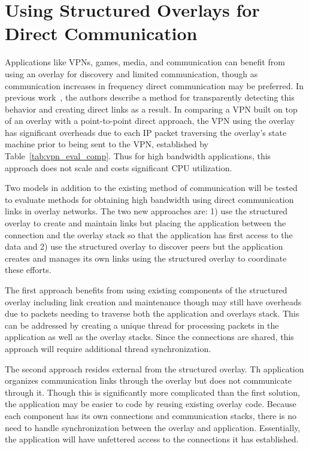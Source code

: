 \section{Using Structured Overlays for Direct Communication}
\label{direct_communication}
Applications like VPNs, games, media, and communication can benefit from using
an overlay for discovery and limited communication, though as communication
increases in frequency direct communication may be preferred.  In previous
work~\cite{wow}, the authors describe a method for transparently detecting this
behavior and creating direct links as a result.  In comparing a VPN built on
top of an overlay with a point-to-point direct approach, the VPN using the
overlay has significant overheads due to each IP packet traversing the overlay's
state machine prior to being sent to the VPN, established by
Table~\ref{tab:vpn_eval_comp}.  Thus for high bandwidth applications, this
approach does not scale and costs significant CPU utilization.

Two models in addition to the existing method of communication will be tested
to evaluate methods for obtaining high bandwidth using direct communication
links in overlay networks.  The two new approaches are:  1) use the structured
overlay to create and maintain links but placing the application between the
connection and the overlay stack so that the application has first access to
the data and 2) use the structured overlay to discover peers but the
application creates and manages its own links using the structured overlay to
coordinate these efforts.  %

The first approach benefits from using existing components of the structured
overlay including link creation and maintenance though may still have overheads
due to packets needing to traverse both the application and overlays stack.
This can be addressed by creating a unique thread for processing packets in the
application as well as the overlay stacks.  Since the connections are shared,
this approach will require additional thread synchronization.

The second approach resides external from the structured overlay.  Th
application organizes communication links through the overlay but does not
communicate through it.  Though this is significantly more complicated than the
first solution, the application may be easier to code by reusing existing
overlay code.  Because each component has its own connections and communication
stacks, there is no need to handle synchronization between the overlay and
application.  Essentially, the application will have unfettered access to the
connections it has established.

